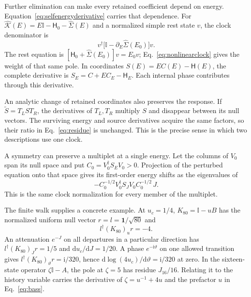 \documentclass[aps,prx,onecolumn,10pt,notitlepage,nofootinbib,longbibliography]{revtex4-2}
\numberwithin{equation}{section}
\numberwithin{table}{section}
\newcommand{\Id}{\mathbb I}
\newcommand{\dd}{\mathrm d}
\newcommand{\ii}{\mathrm i}
\begin{document}
Further elimination can make every retained coefficient depend on energy. Equation~\eqref{eq:selfenergyderivative} carries that dependence. For $\widehat {\mathcal K}(E)=E\Id-\mathsf H_0-\widehat\Sigma(E)$ and a normalized simple rest state $v$, the clock denominator is
\begin{equation}
 v^\dagger\bigl[\Id-\partial_E\widehat\Sigma(E_0)\bigr]v.
 \label{eq:nonlinearclock}
\end{equation}
The rest equation is $[\mathsf H_0+\widehat\Sigma(E_0)]v=E_0v$; Eq.~\eqref{eq:nonlinearclock} gives the weight of that same pole. In coordinates $S(E)=EC(E)-\mathsf H(E)$, the complete derivative is $S_E=C+EC_E-\mathsf H_E$. Each internal phase contributes through this derivative.

An analytic change of retained coordinates also preserves the response. If $\widetilde S=T_LST_R$, the derivatives of $T_L,T_R$ multiply $S$ and disappear between its null vectors. The surviving energy and source derivatives acquire the same factors, so their ratio in Eq.~\eqref{eq:residue} is unchanged. This is the precise sense in which two descriptions use one clock.

A symmetry can preserve a multiplet at a single energy. Let the columns of $V_0$ span its null space and put $C_0=V_0^\dagger S_EV_0>0$. Projection of the perturbed equation onto that space gives its first-order energy shifts as the eigenvalues of
\begin{equation}
 -C_0^{-1/2}V_0^\dagger S_JV_0C_0^{-1/2}\,J.
 \label{eq:multipletresponse}
\end{equation}
This is the same clock normalization for every member of the multiplet.

The finite walk supplies a concrete example. At $u_c=1/4$, $K_{80}=\Id-uB$ has the normalized uniform null vector $r=l=\mathbf1/\sqrt{80}$ and
\begin{equation}
 l^\dagger (K_{80})_ur=-4.
\end{equation}
An attenuation $e^{-J}$ on all departures in a particular direction has
$l^\dagger (K_{80})_Jr=1/5$ and $\dd u_c/\dd J=1/20$. A phase $e^{-\ii\vartheta}$ on one allowed transition gives $l^\dagger (K_{80})_\vartheta r=\ii/320$, hence $\dd\log(4u_c)/\dd\vartheta=\ii/320$ at zero. In the sixteen-state operator $\zeta\Id-A$, the pole at $\zeta=5$ has residue $J_{16}/16$. Relating it to the history variable carries the derivative of $\zeta=u^{-1}+4u$ and the prefactor $u$ in Eq.~\eqref{eq:bass}.
\end{document}

